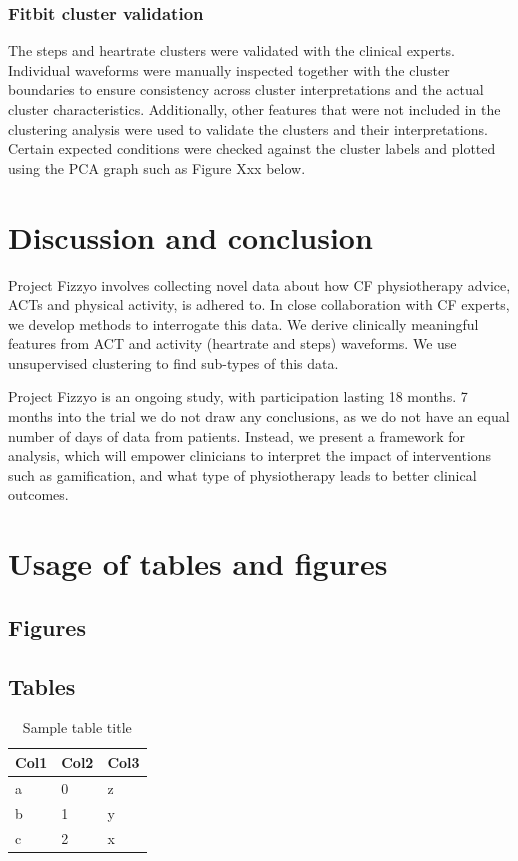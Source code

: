 \documentclass{article}
\begin{document}
\subsubsection{Fitbit cluster validation }

The steps and heartrate clusters were validated with the clinical experts. Individual waveforms were manually inspected together with the cluster boundaries to ensure consistency across cluster interpretations and the actual cluster characteristics. Additionally, other features that were not included in the clustering analysis were used to validate the clusters and their interpretations. Certain expected conditions were checked against the cluster labels and plotted using the PCA graph such as Figure Xxx below. 


\section{Discussion and conclusion} 

Project Fizzyo involves collecting novel data about how CF physiotherapy advice, ACTs and physical activity, is adhered to. In close collaboration with CF experts, we develop methods to interrogate this data. We derive clinically meaningful features from ACT and activity (heartrate and steps) waveforms. We use unsupervised clustering to find sub-types of this data. 

Project Fizzyo is an ongoing study, with participation lasting 18 months. 7 months into the trial we do not draw any conclusions, as we do not have an equal number of days of data from patients. Instead, we present a framework for analysis, which will empower clinicians to interpret the impact of interventions such as gamification, and what type of physiotherapy leads to better clinical outcomes.

\section{Usage of tables and figures}
\subsection{Figures}



\subsection{Tables}
\begin{table}
  \caption{Sample table title}
  \label{sample_table}
  \centering
  \begin{tabular}{lll}
    \toprule
    \cmidrule(r){1-2}
    Col1 & Col2 & Col3 \\
    \midrule
    a & 0 & z\\
    b & 1 & y \\
    c & 2 & x \\
    \bottomrule
  \end{tabular}
\end{table}
\end{document}
